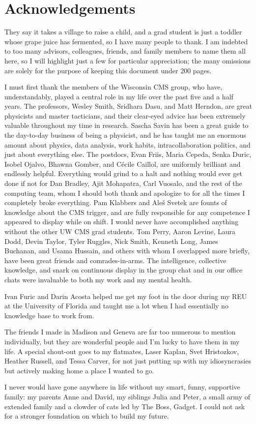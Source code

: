 
\section{Acknowledgements}

They say it takes a village to raise a child, and a grad student is just a toddler whose grape juice has fermented, so I have many people to thank.
I am indebted to too many advisors, colleagues, friends, and family members to name them all here, so I will highlight just a few for particular appreciation; the many omissions are solely for the purpose of keeping this document under 200 pages.

I must first thank the members of the Wisconsin CMS group, who have, understandably, played a central role in my life over the past five and a half years.
The professors, Wesley Smith, Sridhara Dasu, and Matt Herndon, are great physicists and master tacticians, and their clear-eyed advice has been extremely valuable throughout my time in research.
Sascha Savin has been a great guide to the day-to-day business of being a physicist, and he has taught me an enormous amount about physics, data analysis, work habits, intracollaboration politics, and just about everything else.
The postdocs, Evan Friis, Maria Cepeda, Senka Duric, Isobel Ojalvo, Bhawna Gomber, and C{\'e}cile Caillol, are uniformly brilliant and endlessly helpful.
Everything would grind to a halt and nothing would ever get done if not for Dan Bradley, Ajit Mohapatra, Carl Vuosalo, and the rest of the computing team, whom I should both thank and apologize to for all the times I completely broke everything.
Pam Klabbers and Ale{\v{s}} Svetek are founts of knowledge about the CMS trigger, and are fully responsible for any competence I appeared to display while on shift.
I would never have accomplished anything without the other UW CMS grad students.
Tom Perry, Aaron Levine, Laura Dodd, Devin Taylor, Tyler Ruggles, Nick Smith, Kenneth Long, James Buchanan, and Usama Hussain, and others with whom I overlapped more briefly, have been great friends and comrades-in-arms.
The intelligence, collective knowledge, and snark on continuous display in the group chat and in our office chats were invaluable to both my work and my mental health.

Ivan Furic and Darin Acosta helped me get my foot in the door during my REU at the University of Florida and taught me a lot when I had essentially no knowledge base to work from.

The friends I made in Madison and Geneva are far too numerous to mention individually, but they are wonderful people and I'm lucky to have them in my life.
A special shout-out goes to my flatmates, Laser Kaplan, Svet Hristozkov, Heather Russell, and Tessa Carver, for not just putting up with my idiosyncrasies but actively making home a place I wanted to go.

I never would have gone anywhere in life without my smart, funny, supportive family: my parents Anne and David, my siblings Julia and Peter, a small army of extended family and a clowder of cats led by The Boss, Gadget.
I could not ask for a stronger foundation on which to build my future.
